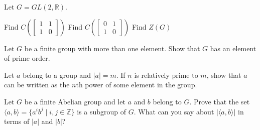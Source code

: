 \documentclass[11pt,largemargins]{homework}
\begin{document}
\question
Let $G=GL(2,\mathbb{R})$.
\begin{alphaparts}
    \questionpart
    Find $C\left(\begin{bmatrix} 1 & 1 \\ 1 & 0 \end{bmatrix}\right)$
    \questionpart
    Find $C\left(\begin{bmatrix} 0 & 1 \\ 1 & 0 \end{bmatrix}\right)$
    \questionpart
    Find $Z(G)$
\end{alphaparts}

\question
Let $G$ be a finite group with more than one element. Show that $G$ has an element of prime order.

\question
Let $a$ belong to a group and $|a|=m$. If $n$ is relatively prime to $m$, show that $a$ can be written as the $n$th power 
of some element in the group.

\question
Let $G$ be a finite Abelian group and let $a$ and $b$ belong to $G$. Prove that the set 
$\langle a,b\rangle=\{a^ib^j\;|\;i,j \in\mathbb{Z}\}$ is a subgroup of $G$. What can you say about $|\langle a,b\rangle|$ in 
terms of $|a|$ and $|b|$?
\end{document}
